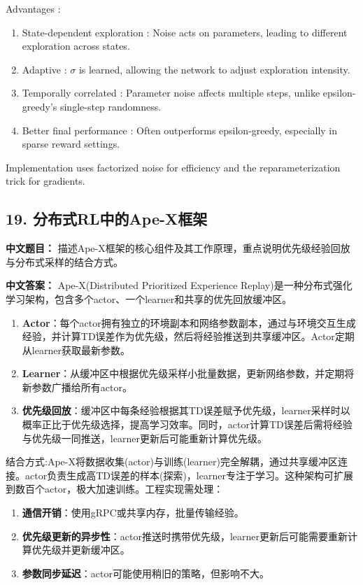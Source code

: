 \documentclass[10pt,a4paper]{ctexart}
\begin{document}
 Advantages :
\begin{enumerate}
    \item State-dependent exploration : Noise acts on parameters, leading to different exploration across states.
    \item Adaptive : \(\sigma\) is learned, allowing the network to adjust exploration intensity.
    \item Temporally correlated : Parameter noise affects multiple steps, unlike epsilon-greedy's single-step randomness.
    \item Better final performance : Often outperforms epsilon-greedy, especially in sparse reward settings.
\end{enumerate}

Implementation uses factorized noise for efficiency and the reparameterization trick for gradients.

\subsection*{19. 分布式RL中的Ape-X框架}
\textbf{中文题目：} 描述Ape-X框架的核心组件及其工作原理，重点说明优先级经验回放与分布式采样的结合方式。

\textbf{中文答案：}  
Ape-X(Distributed Prioritized Experience Replay)是一种分布式强化学习架构，包含多个actor、一个learner和共享的优先回放缓冲区。

\begin{enumerate}
    \item \textbf{Actor}：每个actor拥有独立的环境副本和网络参数副本，通过与环境交互生成经验，并计算TD误差作为优先级，然后将经验推送到共享缓冲区。Actor定期从learner获取最新参数。
    \item \textbf{Learner}：从缓冲区中根据优先级采样小批量数据，更新网络参数，并定期将新参数广播给所有actor。
    \item \textbf{优先级回放}：缓冲区中每条经验根据其TD误差赋予优先级，learner采样时以概率正比于优先级选择，提高学习效率。同时，actor计算TD误差后需将经验与优先级一同推送，learner更新后可能重新计算优先级。
\end{enumerate}

 结合方式:Ape-X将数据收集(actor)与训练(learner)完全解耦，通过共享缓冲区连接。actor负责生成高TD误差的样本(探索)，learner专注于学习。这种架构可扩展到数百个actor，极大加速训练。工程实现需处理：
\begin{enumerate}
    \item \textbf{通信开销}：使用gRPC或共享内存，批量传输经验。
    \item \textbf{优先级更新的异步性}：actor推送时携带优先级，learner更新后可能需要重新计算优先级并更新缓冲区。
    \item \textbf{参数同步延迟}：actor可能使用稍旧的策略，但影响不大。
\end{enumerate}
\end{document}
